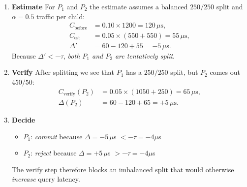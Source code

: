 \medskip
\begin{enumerate}[leftmargin=*, nosep]

\item \textbf{Estimate}\;
   For $P_1$ and $P_2$ the estimate assumes a balanced $250/250$ split
   and $\alpha=0.5$ traffic per child:
\begin{align*}
C_{\text{before}} &= 0.10 \times 1200 = 120\,\mu\text{s},\\
C_{\text{est}}    &= 0.05 \times (550+550)=55\,\mu\text{s},\\
\Delta'           &= 60 - 120 + 55 = -5\,\mu\text{s}.
\end{align*}
Because $\Delta' < -\tau$, \emph{both $P_1$ and $P_2$ are tentatively
split}.

\item \textbf{Verify}\;
   After splitting we see that $P_1$ has a $250/250$ split, but $P_2$ comes out $450/50$:
\begin{align*}
C_{\text{verify}}(P_2) &= 0.05 \times (1050+250)=65\,\mu\text{s},\\
\Delta(P_2)            &= 60 - 120 + 65 = +5\,\mu\text{s}.
\end{align*}

\item \textbf{Decide}\;
\begin{itemize}[leftmargin=1.3em,itemsep=2pt]
  \item $P_1$: \emph{commit} because $\Delta=-5\,\mu$s $<-\tau = -4 \mu$s
  \item $P_2$: \emph{reject} because $\Delta=+5\,\mu$s $>-\tau = -4 \mu$s
\end{itemize}
   The verify step therefore blocks an imbalanced split that would
   otherwise \emph{increase} query latency.
\end{enumerate}
